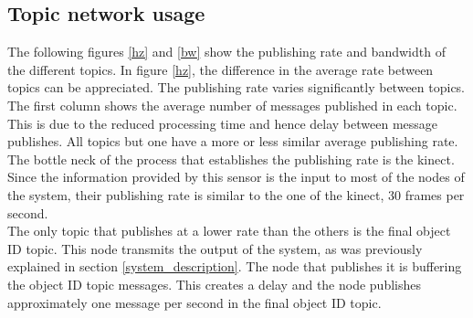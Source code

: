 			

		\subsection{Topic network usage}
		\label{results_topics}

			The following figures \ref{hz} and \ref{bw} show the publishing rate and bandwidth of the different topics. 
			In figure \ref{hz}, the difference in the average rate between topics can be appreciated. 
			The publishing rate varies significantly between topics. 
			The first column shows the average number of messages published in each topic. 
			This is due to the reduced processing time and hence delay between message publishes. 
			All topics but one have a more or less similar average publishing rate.
			The bottle neck of the process that establishes the publishing rate is the kinect. 
			Since the information provided by this sensor is the input to most of the nodes of the system, their publishing rate is similar to the one of the kinect, 30 frames per second.  
			\\

			The only topic that publishes at a lower rate than the others is the final object ID topic. 
			This node transmits the output of the system, as was previously explained in section \ref{system_description}.
			The node that publishes it is buffering the object ID topic messages. 
			This creates a delay and the node publishes approximately one message per second in the final object ID topic. 

